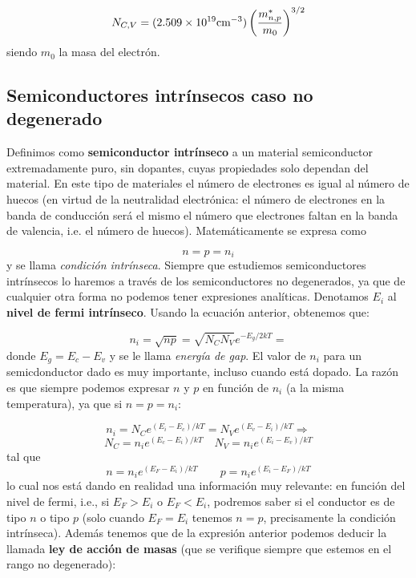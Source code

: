 \begin{equation}
	N_{C,V} = (2.509\times10^{19} \text{cm}^{-3}) \left( \frac{m_{n,p}^*}{m_0} \right)^{3/2}
\end{equation}
siendo $m_0$ la masa del electrón.
\subsection{Semiconductores intrínsecos caso no degenerado}

Definimos como \textbf{semiconductor intrínseco} a un material semiconductor extremadamente puro, sin dopantes, cuyas propiedades solo dependan del material. En este tipo de materiales el número de electrones es igual al número de huecos (en virtud de la neutralidad electrónica: el número de electrones en la banda de conducción será el mismo el número que electrones faltan en la banda de valencia, i.e. el número de huecos). Matemáticamente se expresa como 

\begin{equation}
	n = p = n_i
\end{equation}
y se llama \textit{condición intrínseca}. Siempre que estudiemos semiconductores intrínsecos lo haremos a través de los semiconductores no degenerados, ya que de cualquier otra forma no podemos tener expresiones analíticas. Denotamos $E_i$ al \textbf{nivel de fermi intrínseco}. Usando la ecuación anterior, obtenemos que:

\begin{equation}
	n_i = \sqrt{np} = \sqrt{N_CN_V} e^{-E_g/2kT} = 
\end{equation}
donde $E_g=E_c-E_v$ y se le llama \textit{energía de gap}. El valor de $n_i$ para un semicdonductor dado es muy importante, incluso cuando está dopado. La razón es que siempre podemos expresar $n$ y $p$  en función de $n_i$ (a la misma temperatura), ya que si $n=p=n_i$:

\begin{equation*}
	n_i = N_C e^{(E_i-E_c)/kT} = N_V e^{(E_v-E_i)/kT}  \Rightarrow 
\end{equation*}
\begin{equation}	
	N_C=n_i e^{(E_c-E_i)/kT} \quad N_V = n_i e^{(E_i-E_v)/kT} \label{Ec:01-3-13}
 \end{equation}
tal que
\begin{equation}
	n=n_i e^{(E_F-E_i)/kT} \qquad p = n_i e^{(E_i-E_F)/kT} \label{Ec:01-3-14}
\end{equation}
lo cual nos está dando en realidad una información muy relevante: en función del nivel de fermi, i.e., si $E_F>E_i$ o $E_F<E_i$, podremos saber si el conductor es de tipo $n$ o tipo $p$ (solo cuando $E_F=E_i$ tenemos $n=p$, precisamente la condición intrínseca). Además tenemos que de la expresión anterior podemos deducir la llamada \textbf{ley de acción de masas} (que se verifique siempre que estemos en el rango no degenerado):

